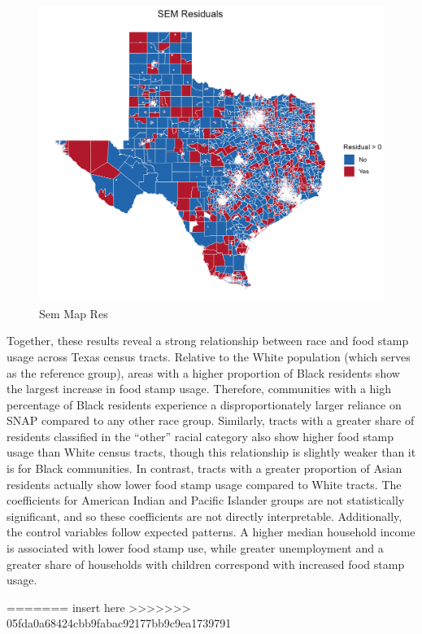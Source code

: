 \documentclass[]{article}
\begin{document}
\begin{figure}
\centering
\includegraphics{sem_r_map.png}
\caption{Sem Map Res}
\end{figure}

Together, these results reveal a strong relationship between race and
food stamp usage across Texas census tracts. Relative to the White
population (which serves as the reference group), areas with a higher
proportion of Black residents show the largest increase in food stamp
usage. Therefore, communities with a high percentage of Black residents
experience a disproportionately larger reliance on SNAP compared to any
other race group. Similarly, tracts with a greater share of residents
classified in the ``other'' racial category also show higher food stamp
usage than White census tracts, though this relationship is slightly
weaker than it is for Black communities. In contrast, tracts with a
greater proportion of Asian residents actually show lower food stamp
usage compared to White tracts. The coefficients for American Indian and
Pacific Islander groups are not statistically significant, and so these
coefficients are not directly interpretable. Additionally, the control
variables follow expected patterns. A higher median household income is
associated with lower food stamp use, while greater unemployment and a
greater share of households with children correspond with increased food
stamp usage.

======= insert here
\textgreater\textgreater\textgreater\textgreater\textgreater\textgreater\textgreater{}
05fda0a68424cbb9fabac92177bb9c9ea1739791
\end{document}

